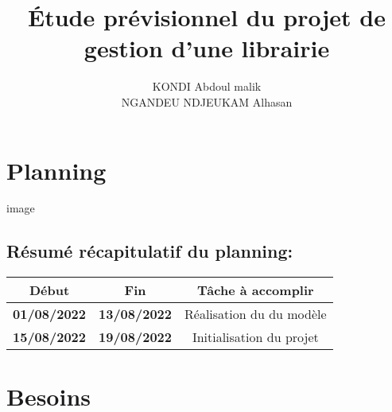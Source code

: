 \documentclass[12pt,a4paper]{article}
\author{KONDI Abdoul malik \\ NGANDEU NDJEUKAM Alhasan}
\title{Étude prévisionnel du projet de gestion d'une librairie}
\begin{document}
\maketitle
\tableofcontents
\newpage

\section{Planning}

image

\subsection{Résumé récapitulatif du planning:}
\begin{tabular}{|c|c|c|}
\hline 
Début & Fin & Tâche à accomplir \\ 
\hline 
\textbf{01/08/2022} & \textbf{13/08/2022} & Réalisation du du modèle \\ 
\hline 
\textbf{15/08/2022} & \textbf{19/08/2022} & Initialisation du projet \\ 
\hline 
\end{tabular} 

\section{Besoins}
\end{document}
